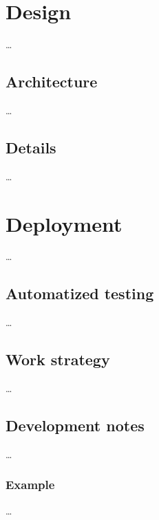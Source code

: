 \documentclass[12pt, a4paper]{report}
\begin{document}

\chapter{Design}

    \dots

\section{Architecture}

    \dots

\section{Details}

    \dots

\chapter{Deployment}

    \dots

\section{Automatized testing}

    \dots

\section{Work strategy}

    \dots

\section{Development notes}

    \dots

\subsection{Example}

    \dots
\end{document}
